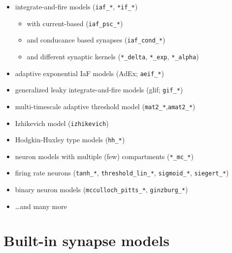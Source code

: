 \documentclass[8pt,t,usepdftitle=false]{beamer}
\begin{document}
\begin{frame}[t,plain]
  \frametitle{\ttl}
  \begin{itemize}
  \item integrate-and-fire models (\texttt{iaf\_*}, \texttt{*if\_*}) 
    \begin{itemize}\itemsep1ex
    \item with current-based (\texttt{iaf\_psc\_*})
    \item and conducance based synapses (\texttt{iaf\_cond\_*})
    \item and different synaptic kernels (\texttt{*\_delta}, \texttt{*\_exp}, \texttt{*\_alpha})
    \end{itemize}
  \item adaptive exponential IaF models (AdEx; \texttt{aeif\_*})
  \item generalized leaky integrate-and-fire models (glif; \texttt{gif\_*})
  \item multi-timescale adaptive threshold model (\texttt{mat2\_*},\texttt{amat2\_*})
  \item Izhikevich model (\texttt{izhikevich})
  \item Hodgkin-Huxley type models (\texttt{hh\_*})
  \item neuron models with multiple (few) compartments (\texttt{*\_mc\_*})
  \item firing rate neurons (\texttt{tanh\_*}, \texttt{threshold\_lin\_*}, \texttt{sigmoid\_*}, \texttt{siegert\_*})
  \item binary neuron models (\texttt{mcculloch\_pitts\_*}, \texttt{ginzburg\_*})
  \item \ldots and many more
  \end{itemize}
\end{frame}
\def\ttl{Built-in synapse models}\section{\ttl}
\end{document}
